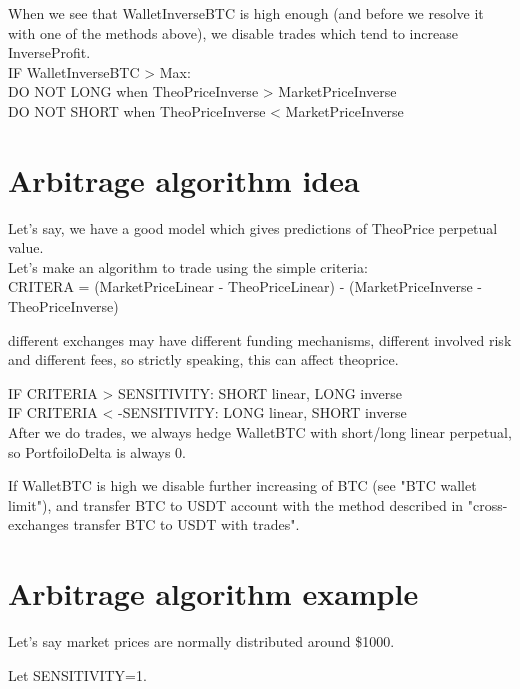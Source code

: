 \documentclass{article}
\begin{document}
When we see that WalletInverseBTC is high enough (and before we resolve it with one of the methods above), we disable trades which tend to increase InverseProfit. \\

IF WalletInverseBTC > Max: \\
DO NOT LONG when TheoPriceInverse > MarketPriceInverse \\
DO NOT SHORT when TheoPriceInverse < MarketPriceInverse \\

\section{Arbitrage algorithm idea}

Let's say, we have a good model which gives predictions of TheoPrice perpetual value. \\

Let's make an algorithm to trade using the simple criteria: \\

CRITERA = (MarketPriceLinear - TheoPriceLinear) - (MarketPriceInverse - TheoPriceInverse)

\danger different exchanges may have different funding mechanisms, different involved risk and different fees, so strictly speaking, this can affect theoprice.

IF CRITERIA > SENSITIVITY: SHORT linear, LONG inverse \\
IF CRITERIA < -SENSITIVITY: LONG linear, SHORT inverse \\

After we do trades, we always hedge WalletBTC with short/long linear perpetual, so PortfoiloDelta is always 0.

If WalletBTC is high we disable further increasing of BTC (see "BTC wallet limit"), and transfer BTC to USDT account with the method described in "cross-exchanges transfer BTC to USDT with trades".

\section{Arbitrage algorithm example}

Let's say market prices are normally distributed around \$1000.

Let SENSITIVITY=1.
\end{document}
